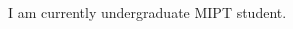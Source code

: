 \documentclass[9pt]{developercv} %
\begin{document}
\vspace{0.5cm}



\begin{minipage}[t]{0.4\textwidth} %
        \vspace{-\baselineskip} %
        I am currently undergraduate MIPT student.

\end{minipage}
\hfill %
\begin{minipage}[t]{0.5\textwidth} %
        \vspace{-\baselineskip} %
        \begin{barchart}{5.5}
        \end{barchart}
\end{minipage}



\end{document}

